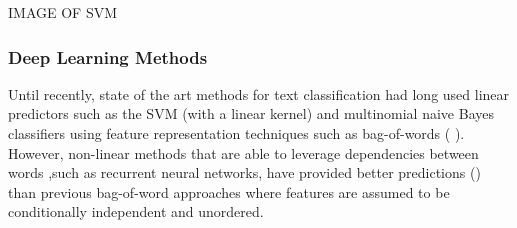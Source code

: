 \noindent
\newline 
IMAGE OF SVM

\subsubsection{Deep Learning Methods}
Until recently, state of the art methods for text classification had long used linear predictors such as the SVM (with a linear kernel) and multinomial naive Bayes classifiers using feature representation techniques such as bag-of-words (\cite{Joachims1998} \cite{Lewis2004}). However, non-linear methods that are able to leverage dependencies between words ,such as recurrent neural networks, have provided better predictions (\cite{Dai2015a}) than previous bag-of-word approaches where features are assumed to be conditionally independent and unordered.